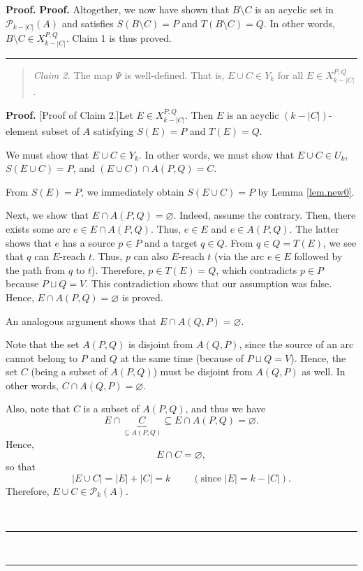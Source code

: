 \documentclass[numbers=enddot,12pt,final,onecolumn,notitlepage]{scrartcl}%
\theoremstyle{definition}
\newenvironment{statement}{\begin{quote}}{\end{quote}}
\newenvironment{proof}[1][Proof]{\noindent\textbf{#1.} }{\ \rule{0.5em}{0.5em}}
\theoremstyle{plainsl}
\begin{document}
\begin{proof}
\begin{proof}
Altogether, we now have shown that $B\setminus C$ is an acyclic set in
$\mathcal{P}_{k-\left\vert C\right\vert }\left(  A\right)  $ and satisfies
$S\left(  B\setminus C\right)  =P$ and $T\left(  B\setminus C\right)  =Q$. In
other words, $B\setminus C\in X_{k-\left\vert C\right\vert }^{P,Q}$. Claim 1
is thus proved.
\end{proof}

\begin{statement}
\textit{Claim 2.} The map $\Psi$ is well-defined. That is, $E\cup C\in Y_{k}$
for all $E\in X_{k-|C|}^{P,Q}$.
\end{statement}

\begin{proof}
[Proof of Claim 2.]Let $E\in X_{k-|C|}^{P,Q}$. Then $E$ is an acyclic $\left(
k-\left\vert C\right\vert \right)  $-element subset of $A$ satisfying
$S\left(  E\right)  =P$ and $T\left(  E\right)  =Q$.

We must show that $E\cup C\in Y_{k}$. In other words, we must show that $E\cup
C\in U_{k}$, $S\left(  E\cup C\right)  =P$, and $\left(  E\cup C\right)  \cap
A\left(  P,Q\right)  =C$.

From $S\left(  E\right)  =P$, we immediately obtain $S\left(  E\cup C\right)
=P$ by Lemma \ref{lem.new0}.

Next, we show that $E\cap A\left(  P,Q\right)  =\varnothing$. Indeed, assume
the contrary. Then, there exists some arc $e\in E\cap A\left(  P,Q\right)  $.
Thus, $e\in E$ and $e\in A\left(  P,Q\right)  $. The latter shows that $e$ has
a source $p\in P$ and a target $q\in Q$. From $q\in Q=T\left(  E\right)  $, we
see that $q$ can $E$-reach $t$. Thus, $p$ can also $E$-reach $t$ (via the arc
$e\in E$ followed by the path from $q$ to $t$). Therefore, $p\in T\left(
E\right)  =Q$, which contradicts $p\in P$ because $P\sqcup Q=V$. This
contradiction shows that our assumption was false. Hence, $E\cap A\left(
P,Q\right)  =\varnothing$ is proved.

An analogous argument shows that $E\cap A\left(  Q,P\right)  =\varnothing$.

Note that the set $A\left(  P,Q\right)  $ is disjoint from $A\left(
Q,P\right)  $, since the source of an arc cannot belong to $P$ and $Q$ at the
same time (because of $P\sqcup Q=V$). Hence, the set $C$ (being a subset of
$A\left(  P,Q\right)  $) must be disjoint from $A\left(  Q,P\right)  $ as
well. In other words, $C\cap A\left(  Q,P\right)  =\varnothing$.

Also, note that $C$ is a subset of $A\left(  P,Q\right)  $, and thus we have
\[
E\cap\underbrace{C}_{\subseteq A\left(  P,Q\right)  }\subseteq E\cap A\left(
P,Q\right)  =\varnothing.
\]
Hence,
\begin{equation}
E\cap C=\varnothing, \label{pf.lem.new4.c2.pf.empty}%
\end{equation}
so that%
\[
\left\vert E\cup C\right\vert =\left\vert E\right\vert +\left\vert
C\right\vert =k\ \ \ \ \ \ \ \ \ \ \left(  \text{since }\left\vert
E\right\vert =k-\left\vert C\right\vert \right)  .
\]
Therefore, $E\cup C\in\mathcal{P}_{k}\left(  A\right)  $.


\end{proof}
\end{proof}
\end{document}
